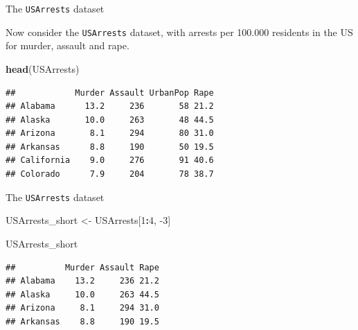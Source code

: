 \documentclass[ignorenonframetext,]{beamer}
\newenvironment{Shaded}{\begin{snugshade}}{\end{snugshade}}
\newcommand{\DecValTok}[1]{\textcolor[rgb]{0.00,0.00,0.81}{#1}}
\newcommand{\KeywordTok}[1]{\textcolor[rgb]{0.13,0.29,0.53}{\textbf{#1}}}
\newcommand{\NormalTok}[1]{#1}
\newcommand{\OperatorTok}[1]{\textcolor[rgb]{0.81,0.36,0.00}{\textbf{#1}}}
\newcommand{\StringTok}[1]{\textcolor[rgb]{0.31,0.60,0.02}{#1}}
\begin{document}
\begin{frame}[fragile]{The \texttt{USArrests} dataset}
\protect\hypertarget{the-usarrests-dataset}{}

Now consider the \texttt{USArrests} dataset, with arrests per 100.000
residents in the US for murder, assault and rape.

\begin{Shaded}
\begin{Highlighting}[]
\KeywordTok{head}\NormalTok{(USArrests)}
\end{Highlighting}
\end{Shaded}

\begin{verbatim}
##            Murder Assault UrbanPop Rape
## Alabama      13.2     236       58 21.2
## Alaska       10.0     263       48 44.5
## Arizona       8.1     294       80 31.0
## Arkansas      8.8     190       50 19.5
## California    9.0     276       91 40.6
## Colorado      7.9     204       78 38.7
\end{verbatim}

\end{frame}

\begin{frame}[fragile]{The \texttt{USArrests} dataset}
\protect\hypertarget{the-usarrests-dataset-1}{}

\begin{Shaded}
\begin{Highlighting}[]
\NormalTok{USArrests_short <-}\StringTok{ }\NormalTok{USArrests[}\DecValTok{1}\OperatorTok{:}\DecValTok{4}\NormalTok{, }\DecValTok{-3}\NormalTok{]}
                            
\NormalTok{USArrests_short}
\end{Highlighting}
\end{Shaded}

\begin{verbatim}
##          Murder Assault Rape
## Alabama    13.2     236 21.2
## Alaska     10.0     263 44.5
## Arizona     8.1     294 31.0
## Arkansas    8.8     190 19.5
\end{verbatim}

\end{frame}
\end{document}
